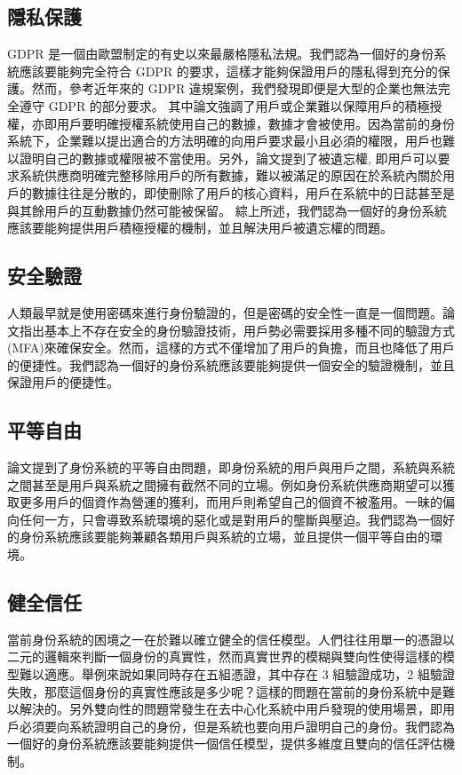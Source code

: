\subsection{隱私保護}
GDPR 是一個由歐盟制定的有史以來最嚴格隱私法規。我們認為一個好的身份系統應該要能夠完全符合 GDPR 的要求，這樣才能夠保證用戶的隱私得到充分的保護。然而，參考近年來的 GDPR 違規案例，我們發現即便是大型的企業也無法完全遵守 GDPR 的部分要求。
其中論文\cite{saemann2022investigating}強調了用戶或企業難以保障用戶的積極授權，亦即用戶要明確授權系統使用自己的數據，數據才會被使用。因為當前的身份系統下，企業難以提出適合的方法明確的向用戶要求最小且必須的權限，用戶也難以證明自己的數據或權限被不當使用。另外，論文\cite{smirnova2024understanding}提到了被遺忘權, 即用戶可以要求系統供應商明確完整移除用戶的所有數據，難以被滿足的原因在於系統內關於用戶的數據往往是分散的，即使刪除了用戶的核心資料，用戶在系統中的日誌甚至是與其餘用戶的互動數據仍然可能被保留。
綜上所述，我們認為一個好的身份系統應該要能夠提供用戶積極授權的機制，並且解決用戶被遺忘權的問題。
\subsection{安全驗證}
人類最早就是使用密碼來進行身份驗證的，但是密碼的安全性一直是一個問題。論文\cite{6234436}指出基本上不存在安全的身份驗證技術，用戶勢必需要採用多種不同的驗證方式(MFA)來確保安全。然而，這樣的方式不僅增加了用戶的負擔，而且也降低了用戶的便捷性。我們認為一個好的身份系統應該要能夠提供一個安全的驗證機制，並且保證用戶的便捷性。
\subsection{平等自由}
論文\cite{preukschat2021self}提到了身份系統的平等自由問題，即身份系統的用戶與用戶之間，系統與系統之間甚至是用戶與系統之間擁有截然不同的立場。例如身份系統供應商期望可以獲取更多用戶的個資作為營運的獲利，而用戶則希望自己的個資不被濫用。一昧的偏向任何一方，只會導致系統環境的惡化或是對用戶的壟斷與壓迫。我們認為一個好的身份系統應該要能夠兼顧各類用戶與系統的立場，並且提供一個平等自由的環境。
\subsection{健全信任}
當前身份系統的困境之一在於難以確立健全的信任模型。人們往往用單一的憑證以二元的邏輯來判斷一個身份的真實性，然而真實世界的模糊\cite{s22155641}與雙向性\cite{4489846}使得這樣的模型難以適應。舉例來說如果同時存在五組憑證，其中存在 3 組驗證成功，2 組驗證失敗，那麼這個身份的真實性應該是多少呢？這樣的問題在當前的身份系統中是難以解決的。另外雙向性的問題常發生在去中心化系統中用戶發現的使用場景，即用戶必須要向系統證明自己的身份，但是系統也要向用戶證明自己的身份。我們認為一個好的身份系統應該要能夠提供一個信任模型，提供多維度且雙向的信任評估機制。
